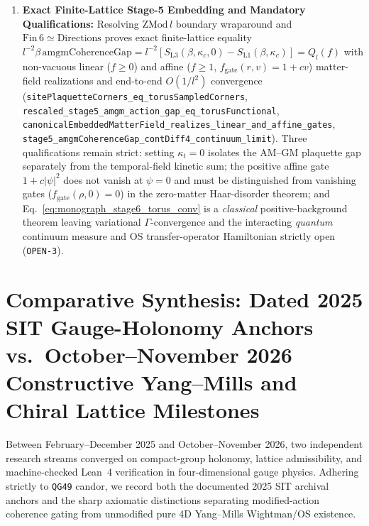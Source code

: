 \begin{enumerate}[leftmargin=2em]
  \item \textbf{Exact Finite-Lattice Stage-5 Embedding and Mandatory Qualifications:} Resolving $\mathrm{ZMod}\,l$ boundary wraparound and $\mathrm{Fin}\,6 \simeq \mathrm{Directions}$ proves exact finite-lattice equality $l^{-2}\beta\,\mathrm{amgmCoherenceGap} = l^{-2}[S_{\mathrm{L3}}(\beta,\kappa_c,0) - S_{\mathrm{L1}}(\beta,\kappa_c)] = Q_l(f)$ with non-vacuous linear ($f \ge 0$) and affine ($f \ge 1$, $f_{\mathrm{gate}}(r,v) = 1 + c v$) matter-field realizations and end-to-end $O(1/l^2)$ convergence (\texttt{sitePlaquetteCorners\_\allowbreak{}eq\_\allowbreak{}torusSampledCorners}, \texttt{rescaled\_\allowbreak{}stage5\_\allowbreak{}amgm\_\allowbreak{}action\_\allowbreak{}gap\_\allowbreak{}eq\_\allowbreak{}torusFunctional}, \texttt{canonicalEmbeddedMatterField\_\allowbreak{}realizes\_\allowbreak{}linear\_\allowbreak{}and\_\allowbreak{}affine\_\allowbreak{}gates}, \texttt{stage5\_\allowbreak{}amgmCoherenceGap\_\allowbreak{}contDiff4\_\allowbreak{}continuum\_\allowbreak{}limit}). Three qualifications remain strict: setting $\kappa_t = 0$ isolates the AM--GM plaquette gap separately from the temporal-field kinetic sum; the positive affine gate $1 + c|\psi|^2$ does not vanish at $\psi = 0$ and must be distinguished from vanishing gates ($f_{\mathrm{gate}}(\rho,0) = 0$) in the zero-matter Haar-disorder theorem; and Eq.~\eqref{eq:monograph_stage6_torus_conv} is a \emph{classical} positive-background theorem leaving variational $\Gamma$-convergence and the interacting \emph{quantum} continuum measure and OS transfer-operator Hamiltonian strictly open (\texttt{OPEN-3}).
\end{enumerate}

\section{Comparative Synthesis: Dated 2025 SIT Gauge-Holonomy Anchors vs.\ October--November 2026 Constructive Yang--Mills and Chiral Lattice Milestones}
\label{sec:2025-vs-2026-ym}

Between February--December 2025 and October--November 2026, two independent research streams converged on compact-group holonomy, lattice admissibility, and machine-checked Lean~4 verification in four-dimensional gauge physics. Adhering strictly to \texttt{QG49} candor, we record both the documented 2025 SIT archival anchors and the sharp axiomatic distinctions separating modified-action coherence gating from unmodified pure 4D Yang--Mills Wightman/OS existence.

